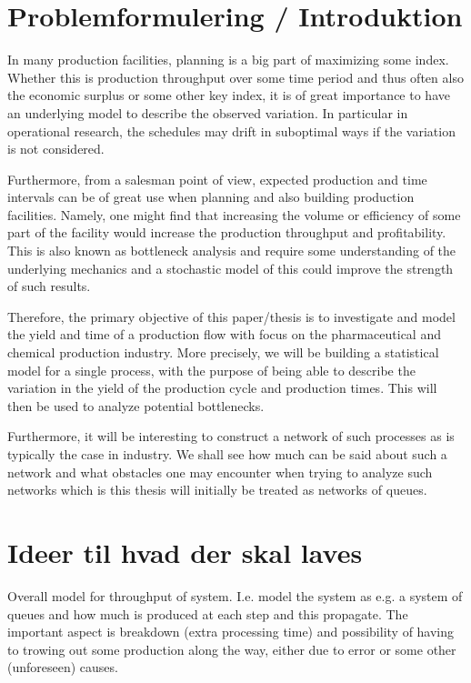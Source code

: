 \documentclass[../Thesis.tex]{subfiles}
\begin{document}
\chapter{
    Problemformulering / Introduktion
}

In many production facilities, planning is a big part of maximizing some index. Whether this is production throughput over some time period and thus often also the economic surplus or some other key index, it is of great importance to have an underlying model to describe the observed variation. In particular in operational research, the schedules may drift in suboptimal ways if the variation is not considered.


Furthermore, from a salesman point of view, expected production and time intervals can be of great use when planning and also building production facilities. Namely, one might find that increasing the volume or efficiency of some part of the facility would increase the production throughput and profitability. This is also known as bottleneck analysis and require some understanding of the underlying mechanics and a stochastic model of this could improve the strength of such results.


Therefore, the primary objective of this paper/thesis is to investigate and model the yield and time of a production flow with focus on the pharmaceutical and chemical production industry. More precisely, we will be building a statistical model for a single process, with the purpose of being able to describe the variation in the yield of the production cycle and production times. This will then be used to analyze potential bottlenecks.

Furthermore, it will be interesting to construct a network of such processes as is typically the case in industry. We shall see how much can be said about such a network and what obstacles one may encounter when trying to analyze such networks which is this thesis will initially be treated as networks of queues.












\chapter{Ideer til hvad der skal laves}

Overall model for throughput of system. I.e. model the system as e.g. a system of queues and how much is produced at each step and this propagate. The important aspect is breakdown (extra processing time) and possibility of having to trowing out some production along the way, either due to error or some other (unforeseen) causes.
\end{document}
